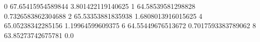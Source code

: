0 67.65415954589844 3.801422119140625
1 64.58539581298828 0.7326583862304688
2 65.53353881835938 1.6808013916015625
4 65.05238342285156 1.19964599609375
6 64.55449676513672 0.7017593383789062
8 63.85273742675781 0.0

